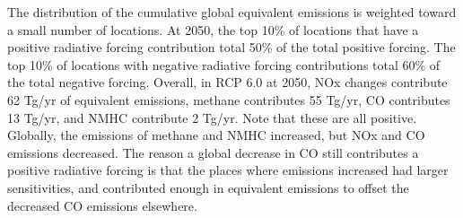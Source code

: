The distribution of the cumulative global equivalent emissions is weighted toward a small number of locations. At 2050, the top 10\% of locations that have a positive radiative forcing contribution total 50\% of the total positive forcing. The top 10\% of locations with negative radiative forcing contributions total 60\% of the total negative forcing. Overall, in RCP 6.0 at 2050, NOx changes contribute 62 Tg/yr of equivalent emissions, methane contributes 55 Tg/yr, CO contributes 13 Tg/yr, and NMHC contribute 2 Tg/yr. Note that these are all positive. Globally, the emissions of methane and NMHC increased, but NOx and CO emissions decreased. The reason a global decrease in CO still contributes a positive radiative forcing is that the places where emissions increased had larger sensitivities, and contributed enough in equivalent emissions to offset the decreased CO emissions elsewhere.

